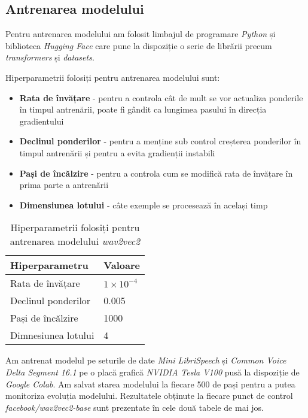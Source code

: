 \subsection{Antrenarea modelului}
Pentru antrenarea modelului am folosit limbajul de programare \textit{Python} și biblioteca \textit{Hugging Face}
care pune la dispoziție o serie de librării precum \textit{transformers} și \textit{datasets}.
\par
Hiperparametrii folosiți pentru antrenarea modelului sunt:
\begin{itemize}
    \item \textbf{Rata de învățare} - pentru a controla cât de mult se vor actualiza ponderile în timpul
    antrenării, poate fi gândit ca lungimea pasului în direcția gradientului
    \item \textbf{Declinul ponderilor} - pentru a menține sub control creșterea ponderilor în timpul antrenării
    și pentru a evita gradienții instabili
    \item \textbf{Pași de încălzire} - pentru a controla cum se modifică rata de învățare în prima parte 
    a antrenării
    \item \textbf{Dimensiunea lotului} - câte exemple se procesează în același timp
\end{itemize}

\vspace{0.5em}

\begin{table}[h]
    \centering
    \caption{Hiperparametrii folosiți pentru antrenarea modelului \textit{wav2vec2}}
    \label{tab:wav2vec2-hyperparameters}
    \begin{tabular}{@{}lp{2cm}@{}} %
    \toprule %
    \textbf{Hiperparametru} & \textbf{Valoare} \\
    \midrule %
    Rata de învățare & $1 \times 10^{-4}$ \\
    Declinul ponderilor & 0.005 \\
    Pași de încălzire & 1000 \\
    Dimnesiunea lotului & 4 \\
    \bottomrule %
    \end{tabular}
\end{table}

\par
Am antrenat modelul pe seturile de date \textit{Mini LibriSpeech} și \textit{Common Voice Delta Segment 16.1}
pe o placă grafică \textit{NVIDIA Tesla V100} pusă la dispoziție de \textit{Google Colab}. Am salvat starea modelului
la fiecare 500 de pași pentru a putea monitoriza evoluția modelului. Rezultatele obținute la fiecare punct de control
\textit{facebook/wav2vec2-base} sunt prezentate în cele două tabele de mai jos.


